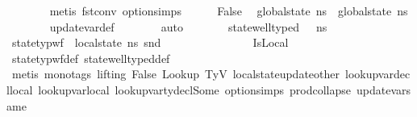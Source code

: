 \begin{isabellebody}
\ \ \ \ \ \ \isamarkupfalse%
\ {\isacharparenleft}{\kern0pt}metis\ fst{\isacharunderscore}{\kern0pt}conv\ option{\isachardot}{\kern0pt}simps{\isacharparenleft}{\kern0pt}{}{\isacharparenright}{\kern0pt}{\isacharparenright}{\kern0pt}\isanewline
\ \ \ \ \isamarkupfalse%
\ False\ \isamarkupfalse%
\ {\isachardoublequoteopen}global{\isacharunderscore}{\kern0pt}state\ {\isacharquery}{\kern0pt}ns{\isacharprime}{\kern0pt}\ {\isacharequal}{\kern0pt}\ global{\isacharunderscore}{\kern0pt}state\ ns{\isachardoublequoteclose}\isanewline
\ \ \ \ \ \ \isamarkupfalse%
\ update{\isacharunderscore}{\kern0pt}var{\isacharunderscore}{\kern0pt}def\isanewline
\ \ \ \ \ \ \isamarkupfalse%
\ auto\isanewline
\ \ \ \ \isamarkupfalse%
\ \isamarkupfalse%
\ {\isacartoucheopen}state{\isacharunderscore}{\kern0pt}well{\isacharunderscore}{\kern0pt}typed\ {\isasymLambda}\ {\isasymOmega}\ ns{\isacartoucheclose}\ \isamarkupfalse%
\ {\isachardoublequoteopen}state{\isacharunderscore}{\kern0pt}typ{\isacharunderscore}{\kern0pt}wf\ {\isasymOmega}\ {\isacharparenleft}{\kern0pt}local{\isacharunderscore}{\kern0pt}state\ {\isacharquery}{\kern0pt}ns{\isacharprime}{\kern0pt}{\isacharparenright}{\kern0pt}\ {\isacharparenleft}{\kern0pt}snd\ {\isasymLambda}{\isacharparenright}{\kern0pt}{\isachardoublequoteclose}\ \ \ \ \ \ \isanewline
\ \ \ \ \ \ \isamarkupfalse%
\ \ IsLocal\isanewline
\ \ \ \ \ \ \isamarkupfalse%
\ state{\isacharunderscore}{\kern0pt}typ{\isacharunderscore}{\kern0pt}wf{\isacharunderscore}{\kern0pt}def\ state{\isacharunderscore}{\kern0pt}well{\isacharunderscore}{\kern0pt}typed{\isacharunderscore}{\kern0pt}def\isanewline
\ \ \ \ \ \ \isamarkupfalse%
\ {\isacharparenleft}{\kern0pt}metis\ {\isacharparenleft}{\kern0pt}mono{\isacharunderscore}{\kern0pt}tags{\isacharcomma}{\kern0pt}\ lifting{\isacharparenright}{\kern0pt}\ False\ Lookup\ TyV\ local{\isacharunderscore}{\kern0pt}state{\isacharunderscore}{\kern0pt}update{\isacharunderscore}{\kern0pt}other\ lookup{\isacharunderscore}{\kern0pt}var{\isacharunderscore}{\kern0pt}decl{\isacharunderscore}{\kern0pt}local{\isacharunderscore}{\kern0pt}{}\ lookup{\isacharunderscore}{\kern0pt}var{\isacharunderscore}{\kern0pt}local\ lookup{\isacharunderscore}{\kern0pt}var{\isacharunderscore}{\kern0pt}ty{\isacharunderscore}{\kern0pt}decl{\isacharunderscore}{\kern0pt}Some\ option{\isachardot}{\kern0pt}simps{\isacharparenleft}{\kern0pt}{}{\isacharparenright}{\kern0pt}\ prod{\isachardot}{\kern0pt}collapse\ update{\isacharunderscore}{\kern0pt}var{\isacharunderscore}{\kern0pt}same{\isacharparenright}{\kern0pt}\isanewline

\end{isabellebody}
